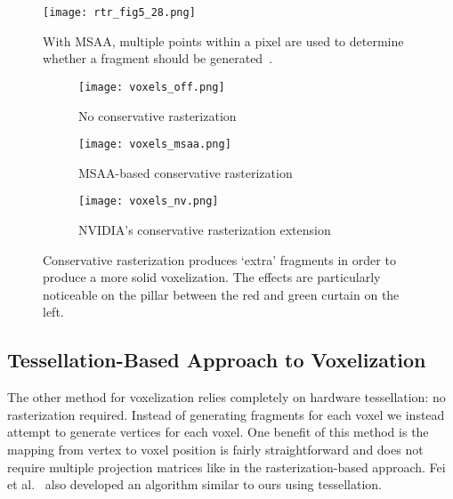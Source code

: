 \begin{figure}[h]
    \centering
    \texttt{[image: rtr\_fig5\_28.png]}
    \caption{With MSAA, multiple points within a pixel are used to determine whether a fragment should be generated~\cite{moller2008rtr}.}
    \label{fig:msaa}
\end{figure}



\begin{figure}[h!]
\centering
    \begin{subfigure}[t]{0.65\textwidth}
        \texttt{[image: voxels\_off.png]}
        \caption{No conservative rasterization}
    \end{subfigure}
    \begin{subfigure}[t]{0.65\textwidth}
        \texttt{[image: voxels\_msaa.png]}
        \caption{MSAA-based conservative rasterization}
    \end{subfigure}
    \begin{subfigure}[t]{0.65\textwidth}
        \texttt{[image: voxels\_nv.png]}
        \caption{NVIDIA's conservative rasterization extension}
    \end{subfigure}
    \caption{Conservative rasterization produces `extra' fragments in order to produce a more solid voxelization. The effects are particularly noticeable on the pillar between the red and green curtain on the left.}
    \label{fig:conservativerasterization}
\end{figure}

\subsection{Tessellation-Based Approach to Voxelization}
The other method for voxelization relies completely on hardware tessellation: no rasterization required. Instead of generating fragments for each voxel we instead attempt to generate vertices for each voxel. One benefit of this method is the mapping from vertex to voxel position is fairly straightforward and does not require multiple projection matrices like in the rasterization-based approach. Fei et al.~\cite{Fei:2012:PV:2305276.2305280} also developed an algorithm similar to ours using tessellation.

